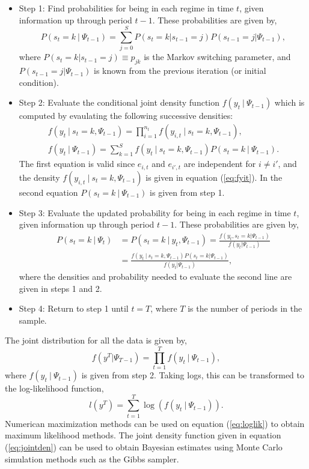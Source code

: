 \documentclass[12pt]{article}
\newcommand{\bi}{\begin{itemize}}
\newcommand{\ei}{\end{itemize}}
\newcommand{\beq}{\begin{equation}}
\newcommand{\eeq}{\end{equation}}
\newcommand{\bdm}{\begin{displaymath}}
\newcommand{\edm}{\end{displaymath}}
\newcommand{\ds}{\displaystyle}
\begin{document}
\bi
\item Step 1: Find probabilities for being in each regime in time $t$, given information up through period $t-1$.  These probabilities are given by,
\bdm P(s_t=k~|~\Psi_{t-1}) = \sum_{j=0}^{S} P(s_t=k | s_{t-1}=j) P(s_{t-1}=j | \Psi_{t-1}), \edm
where $P(s_t=k | s_{t-1}=j) \equiv p_{jk}$ is the Markov switching parameter, and $P(s_{t-1}=j | \Psi_{t-1})$ is known from the previous iteration (or initial condition).

\item Step 2: Evaluate the conditional joint density function $f(y_t ~|~ \Psi_{t-1})$ which is computed by evaulating the following successive densities:
\bdm \begin{array}{l} \ds f(y_t ~|~ s_t=k, \Psi_{t-1}) = \prod_{i=1}^{n_t} f(y_{i,t} ~|~ s_t=k, \Psi_{t-1}), \\ [1pc]
\ds f(y_t ~|~ \Psi_{t-1}) = \sum_{k=1}^{S} f(y_t ~|~ s_t=k, \Psi_{t-1}) P(s_t=k ~|~ \Psi_{t-1}). \end{array} \edm
The first equation is valid since $e_{i,t}$ and $e_{i',t}$ are independent for $i\neq i'$, and the density $f(y_{i,t} ~|~ s_t=k, \Psi_{t-1})$ is given in equation (\ref{eq:fyit}).  In the second equation $P(s_t=k ~|~ \Psi_{t-1})$ is given from step 1.

\item Step 3: Evaluate the updated probability for being in each regime in time $t$, given information up through period $t-1$.  These probabilities are given by,
\bdm \begin{array}{ll} \ds P(s_t=k~|~\Psi_{t}) & \ds = P(s_t=k~|~y_t, \Psi_{t-1}) = \frac{f(y_t, s_t=k | \Psi_{t-1})}{f(y_t | \Psi_{t-1})} \\ [2pc]
 & \ds = \frac{f(y_t ~|~ s_t=k, \Psi_{t-1}) P(s_t=k | \Psi_{t-1})}{f(y_t|\Psi_{t-1})}, \end{array} \edm
where the densities and probability needed to evaluate the second line are given in steps 1 and 2.

\item Step 4: Return to step 1 until $t=T$, where $T$ is the number of periods in the sample.
\ei

The joint distribution for all the data is given by,
\beq \label{eq:jointden} f(y^T | \Psi_{T-1}) = \prod_{t=1}^{T} f(y_t ~|~ \Psi_{t-1}), \eeq
where $f(y_t ~|~ \Psi_{t-1})$ is given from step 2.  Taking logs, this can be transformed to the log-likelihood function,
\beq \label{eq:loglik} l(y^T) = \sum_{t=1}^{T} \log \left( f(y_t ~|~ \Psi_{t-1}) \right). \eeq
Numerican maximization methods can be used on equation (\ref{eq:loglik}) to obtain maximum likelihood methods.  The joint density function given in equation (\ref{eq:jointden}) can be used to obtain Bayesian estimates using Monte Carlo simulation methods such as the Gibbs sampler.
\end{document}
